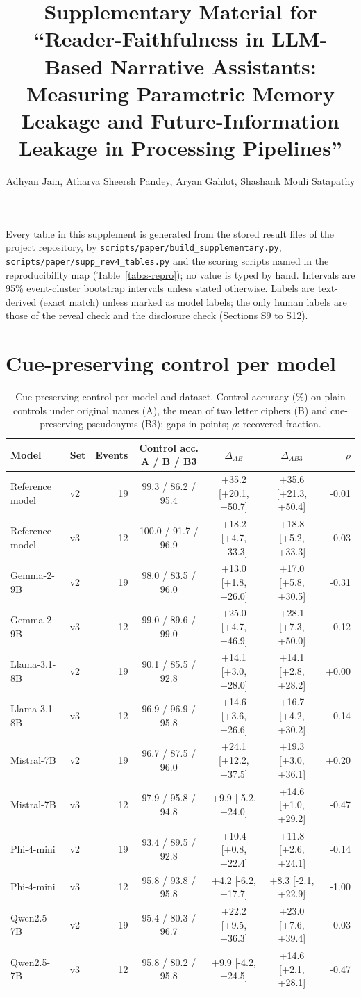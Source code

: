 \documentclass[11pt]{article}
\title{Supplementary Material for ``Reader-Faithfulness in LLM-Based Narrative Assistants: Measuring Parametric Memory Leakage and Future-Information Leakage in Processing Pipelines''}
\author{Adhyan Jain, Atharva Sheersh Pandey, Aryan Gahlot, Shashank Mouli Satapathy}
\date{}
\begin{document}
\maketitle
Every table in this supplement is generated from the stored result files of the project repository, by \texttt{scripts/paper/build\_supplementary.py}, \texttt{scripts/paper/supp\_rev4\_tables.py} and the scoring scripts named in the reproducibility map (Table~\ref{tab:s-repro}); no value is typed by hand. Intervals are 95\% event-cluster bootstrap intervals unless stated otherwise. Labels are text-derived (exact match) unless marked as model labels; the only human labels are those of the reveal check and the disclosure check (Sections S9 to S12).

\section{Cue-preserving control per model}
\begin{table}[!ht]
\centering
\scriptsize
\caption{Cue-preserving control per model and dataset. Control accuracy (\%) on plain controls under original names (A), the mean of two letter ciphers (B) and cue-preserving pseudonyms (B3); gaps in points; $\rho$: recovered fraction.}\label{tab:s-cue}
\begin{tabular}{llrcccr}
\toprule
Model & Set & Events & Control acc. A / B / B3 & $\Delta_{AB}$ & $\Delta_{AB3}$ & $\rho$ \\
\midrule
Reference model & v2 & 19 & 99.3 / 86.2 / 95.4 & +35.2 [+20.1, +50.7] & +35.6 [+21.3, +50.4] & -0.01 \\
Reference model & v3 & 12 & 100.0 / 91.7 / 96.9 & +18.2 [+4.7, +33.3] & +18.8 [+5.2, +33.3] & -0.03 \\
Gemma-2-9B & v2 & 19 & 98.0 / 83.5 / 96.0 & +13.0 [+1.8, +26.0] & +17.0 [+5.8, +30.5] & -0.31 \\
Gemma-2-9B & v3 & 12 & 99.0 / 89.6 / 99.0 & +25.0 [+4.7, +46.9] & +28.1 [+7.3, +50.0] & -0.12 \\
Llama-3.1-8B & v2 & 19 & 90.1 / 85.5 / 92.8 & +14.1 [+3.0, +28.0] & +14.1 [+2.8, +28.2] & +0.00 \\
Llama-3.1-8B & v3 & 12 & 96.9 / 96.9 / 95.8 & +14.6 [+3.6, +26.6] & +16.7 [+4.2, +30.2] & -0.14 \\
Mistral-7B & v2 & 19 & 96.7 / 87.5 / 96.0 & +24.1 [+12.2, +37.5] & +19.3 [+3.0, +36.1] & +0.20 \\
Mistral-7B & v3 & 12 & 97.9 / 95.8 / 94.8 & +9.9 [-5.2, +24.0] & +14.6 [+1.0, +29.2] & -0.47 \\
Phi-4-mini & v2 & 19 & 93.4 / 89.5 / 92.8 & +10.4 [+0.8, +22.4] & +11.8 [+2.6, +24.1] & -0.14 \\
Phi-4-mini & v3 & 12 & 95.8 / 93.8 / 95.8 & +4.2 [-6.2, +17.7] & +8.3 [-2.1, +22.9] & -1.00 \\
Qwen2.5-7B & v2 & 19 & 95.4 / 80.3 / 96.7 & +22.2 [+9.5, +36.3] & +23.0 [+7.6, +39.4] & -0.03 \\
Qwen2.5-7B & v3 & 12 & 95.8 / 80.2 / 95.8 & +9.9 [-4.2, +24.5] & +14.6 [+2.1, +28.1] & -0.47 \\
\bottomrule
\end{tabular}
\end{table}
\end{document}
